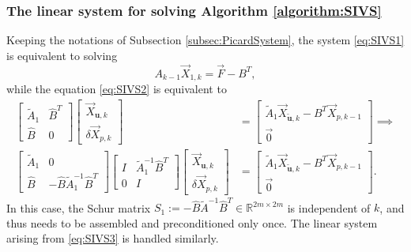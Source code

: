 \documentclass[3p]{elsarticle}
\def\V#1{\mathbf{#1}}
\def\Vt#1{\mathbf{\tilde{#1}}}
\begin{document}
\subsubsection{The linear system for solving Algorithm \ref{algorithm:SIVS}}\label{subsec:SIVSSystem}
Keeping the notations of Subsection \ref{subsec:PicardSystem}, 
the system \eqref{eq:SIVS1} is equivalent to solving 
\begin{equation}
    \label{eq:SIVSSystem1}
    A_{k-1}\overrightarrow{X}_{1,k} =\overrightarrow{F} - B^T,
\end{equation}
while the equation \eqref{eq:SIVS2} is equivalent to
\begin{equation}\label{eq:SIVSSystem2}
\begin{aligned}  
\begin{bmatrix} 
\widetilde{A}_1 & \widehat{B}^T \\ 
\widehat{B} &  0 
\end{bmatrix}
\begin{bmatrix} \overrightarrow{X}_{\V{u},k}  \\ 
\delta \overrightarrow{X}_{p,k}
\end{bmatrix}
& = \begin{bmatrix} \widetilde{A}_1\overrightarrow{X}_{\Vt{u},k} - B^T \overrightarrow{X}_{p,k-1} \\ \overrightarrow{0} \end{bmatrix} \implies \\
\begin{bmatrix} 
\widetilde{A}_1 & 0 \\ 
\widehat{B} &  -\widehat{B} \widetilde{A}_1^{-1} \widehat{B}^T 
\end{bmatrix}
\begin{bmatrix} 
I & \widetilde{A}_1^{-1} \widehat{B}^T \\
0 & I 
\end{bmatrix} 
\begin{bmatrix} 
\overrightarrow{X}_{\V{u},k}  \\ 
\delta \overrightarrow{X}_{p,k}
\end{bmatrix}
& = 
\begin{bmatrix} \widetilde{A}_1\overrightarrow{X}_{\Vt{u},k} - B^T \overrightarrow{X}_{p,k-1} \\ \overrightarrow{0} 
\end{bmatrix}.
\end{aligned}
\end{equation}
In this case, the Schur matrix $S_1:=-\widehat{B} \widetilde{A}^{-1} \widehat{B}^T  \in \mathbb{R}^{2m \times 2m} $ is independent of $k$, and thus needs to be assembled and preconditioned only once. The linear system arising from \eqref{eq:SIVS3} is handled similarly.
\end{document}
